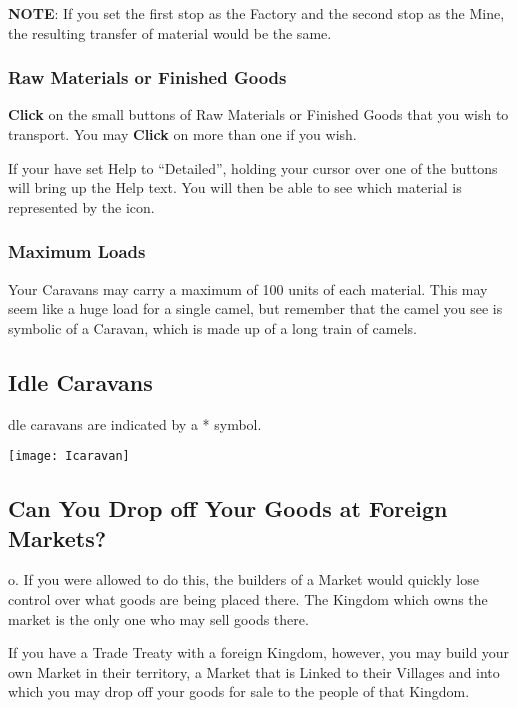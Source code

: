 \textbf{NOTE}: If you set the first stop as the Factory and the second stop as the Mine, the resulting transfer of material would be the same.

\subsubsection{\textsf{Raw Materials or Finished Goods}}

\textbf{Click} on the small buttons of Raw Materials or Finished Goods that you wish to transport. You may \textbf{Click} on more than one if you wish.

If your have set Help to “Detailed”, holding your cursor over one of the buttons will bring up the Help text. You will then be able to see which material is represented by the icon.

\subsubsection{\textsf{Maximum Loads}}

Your Caravans may carry a maximum of 100 units of each material. This may seem like a huge load for a single camel, but remember that the camel you see is symbolic of a Caravan, which is made up of a long train of camels.

\subsection{\textsf{Idle Caravans}}


dle caravans are indicated by a * symbol.

\begin{center}
	\texttt{[image: Icaravan]}
\end{center}

\subsection{\textsf{Can You Drop off Your Goods at Foreign Markets?}}


o. If you were allowed to do this, the builders of a Market would quickly lose control over what goods are being placed there. The Kingdom which owns the market is the only one who may sell goods there.

If you have a Trade Treaty with a foreign Kingdom, however, you may build your own Market in their territory, a Market that is Linked to their Villages and into which you may drop off your goods for sale to the people of that Kingdom.

